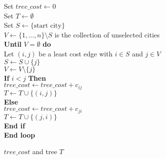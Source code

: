 \begin{parts}
\noindent	Set $tree\_cost \leftarrow 0$ \\
    Set $T \leftarrow \emptyset$ \\
    Set $S \leftarrow \{\text{start city}\}$ \\
	$V \leftarrow \{1,\ldots,n\}\setminus S$ is the collection of unselected cities\\
	{\bf Until} $V = \emptyset$ {\bf do}\\
	\phantom{XXXXXX} Let $(i,j)$ be a least cost edge with $i \in S$ and $j \in V$ \\
	\phantom{XXXXXX} $S \leftarrow S \cup \{j\}$  \\
	\phantom{XXXXXX} $V \leftarrow V \setminus \{j\}$ \\
	\phantom{XXXXXX} {\bf If } $i < j$ {\bf Then} \\
	\phantom{XXXXXXXXX} $tree\_cost \leftarrow tree\_cost + c_{ij}$ \\
	\phantom{XXXXXXXXX} $T \leftarrow T \cup \{(i,j)\}$ \\
	\phantom{XXXXXX} {\bf Else}\\
 		\phantom{XXXXXXXXX} $tree\_cost \leftarrow tree\_cost + c_{ji}$ \\
			\phantom{XXXXXXXXX} $T \leftarrow T \cup \{(j,i)\}$ \\
    \phantom{XXXXXX} {\bf End if}\\
    {\bf End loop}
    
 $tree\_cost$ and tree $T$ 
	

\end{parts}






